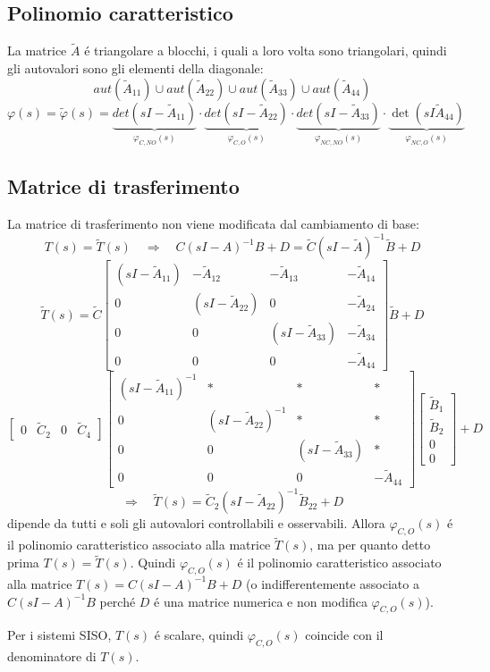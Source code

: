 \documentclass[../main.tex]{subfiles}
\begin{document}
	\subsection{Polinomio caratteristico}
		\label{sec:decomp_kalmann_polinomio}
		La matrice $ \tilde A $ \'e triangolare a blocchi, i quali a loro volta sono triangolari, quindi gli autovalori sono gli elementi della diagonale:
		\[
			aut(\tilde A_{11}) \cup aut(\tilde A_{22}) \cup aut(\tilde A_{33}) \cup aut(\tilde A_{44})
		\]
		\[
			\varphi(s) = \tilde \varphi(s) = \underbrace{det(sI-\tilde A_{11})}_{\varphi_{C,NO}(s)} \cdot \underbrace{det(sI-\tilde A_{22})}_{\varphi_{C,O}(s)} \cdot \underbrace{det(sI-\tilde A_{33})}_{\varphi_{NC,NO}(s)} \cdot \underbrace{\det(sI \tilde A_{44})}_{\varphi_{NC,O}(s)}
		\]
		
	\subsection{Matrice di trasferimento}
		La matrice di trasferimento non viene modificata dal cambiamento di base:
		\[
			T(s) = \tilde T(s) \quad\Rightarrow\quad C(sI-A)^{-1}B+D = \tilde C(sI- \tilde A)^{-1} \tilde B + D
		\]
		\[
			\tilde T(s) = \tilde C
			\begin{bmatrix}
				(sI-\tilde A_{11}) & -\tilde A_{12} & -\tilde A_{13} & -\tilde A_{14}\\
				0 & (sI-\tilde A_{22}) & 0 & -\tilde A_{24}\\
				0 & 0 & (sI-\tilde A_{33}) & -\tilde A_{34}\\
				0 & 0 & 0 & -\tilde A_{44}
			\end{bmatrix} \tilde B + D
		\]
		\[
			\begin{bmatrix}
				0 & \tilde C_2 & 0 & \tilde C_4
			\end{bmatrix}
			\begin{bmatrix}
				(sI-\tilde A_{11})^{-1} & * & * & *\\
				0 & (sI-\tilde A_{22})^{-1} & * & *\\
				0 & 0 & (sI-\tilde A_{33}) & *\\
				0 & 0 & 0 & -\tilde A_{44}
			\end{bmatrix}
			\begin{bmatrix}
				\tilde B_1\\
				\tilde B_2\\
				0\\
				0
			\end{bmatrix} + D
		\]
		\[
			\Rightarrow\quad \tilde T(s) = \tilde C_2 (sI- \tilde A_{22})^{-1} \tilde B_{22} + D
		\]
		dipende da tutti e soli gli autovalori controllabili e osservabili. Allora $ \varphi_{C,O}(s) $ \'e il polinomio caratteristico associato alla matrice $ \tilde T(s) $, ma per quanto detto prima $ T(s) = \tilde T(s) $. Quindi $ \varphi_{C,O}(s) $ \'e il polinomio caratteristico associato alla matrice $ T(s) = C(sI-A)^{-1}B+D $ (o indifferentemente associato a $ C(sI-A)^{-1}B $ perch\'e $ D $ \'e una matrice numerica e non modifica $ \varphi_{C,O}(s) $).
		
		Per i sistemi SISO, $ T(s) $ \'e scalare, quindi $ \varphi_{C,O}(s) $ coincide con il denominatore di $ T(s) $.
\end{document}
